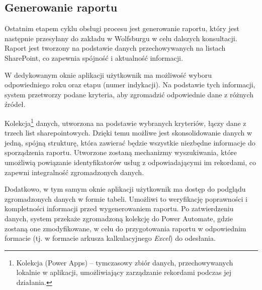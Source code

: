 \subsection{Generowanie raportu}
Ostatnim etapem cyklu obsługi procesu jest generowanie raportu, który jest następnie przesyłany do zakładu w Wolfsburgu w celu dalszych konsultacji. Raport jest tworzony na podstawie danych przechowywanych na listach SharePoint, co zapewnia spójność i aktualność informacji.

W dedykowanym oknie aplikacji użytkownik ma możliwość wyboru odpowiedniego roku oraz etapu (numer indykacji). Na podstawie tych informacji, system przetworzy podane kryteria, aby zgromadzić odpowiednie dane z różnych źródeł.

Kolekcja\footnote{Kolekcja (Power Apps) -- tymczasowy zbiór danych, przechowywanych lokalnie w aplikacji, umożliwiający zarządzanie rekordami podczas jej działania.} danych, utworzona na podstawie wybranych kryteriów, łączy dane z trzech list sharepointowych. Dzięki temu możliwe jest skonsolidowanie danych w jedną, spójną strukturę, która zawierać będzie wszystkie niezbędne informacje do sporządzenia raportu. Utworzone zostaną mechanizmy wyszukiwania, które umożliwią powiązanie identyfikatorów usług z odpowiadającymi im rekordami, co zapewni integralność zgromadzonych danych.

Dodatkowo, w tym samym oknie aplikacji użytkownik ma dostęp do podglądu zgromadzonych danych w formie tabeli. Umożliwi to weryfikację poprawności i kompletności informacji przed wygenerowaniem raportu. Po zatwierdzeniu danych, system przekaże zgromadzoną kolekcję do Power Automate, gdzie zostaną one  zmodyfikowane, w celu do przygotowania raportu w odpowiednim formacie (tj. w formacie arkusza kalkulacyjnego \textit{Excel}) do odesłania.


